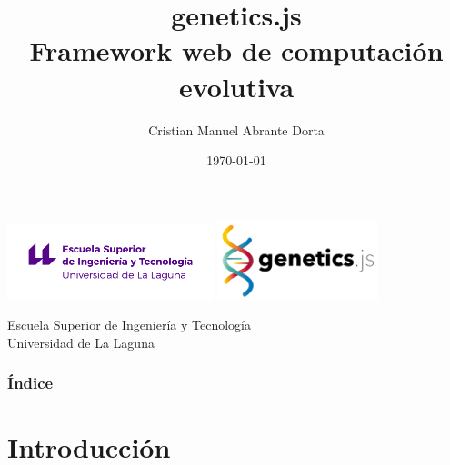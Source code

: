 \documentclass{beamer}
\title[genetics.js]{
    genetics.js \\
    Framework web de computación evolutiva
}
\author[Cristian Abrante]{Cristian Manuel Abrante Dorta}
\institute[ULL]{Universidad de La Laguna}
\date[21-06-2019]{\today}
\begin{document}
  
\begin{frame}

  \includegraphics[width=0.45\textwidth]{pres/img/etsit-logo.png}
  \hspace*{2cm}
  \includegraphics[width=0.35\textwidth]{pres/img/geneticsjs-logo.png}
  \titlepage

  \begin{scriptsize}
    \begin{center}
     Escuela Superior de Ingeniería y Tecnología \\
     Universidad de La Laguna
    \end{center}
  \end{scriptsize}

\end{frame}

\begin{frame}[allowframebreaks]
  \frametitle{Índice}  
  \tableofcontents[sections={1-3}]
  \framebreak
  \tableofcontents[sections={4-6}]
\end{frame}



\section{Introducción}
\end{document}
